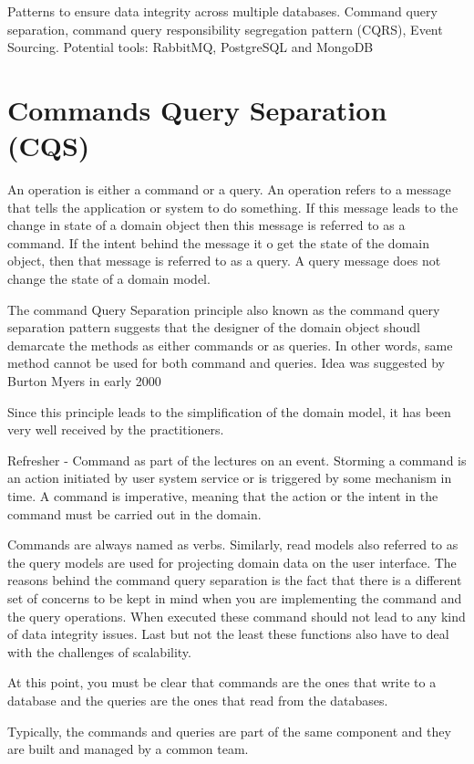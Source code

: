 Patterns to ensure data integrity across multiple databases.
Command query separation, command query responsibility segregation pattern (CQRS), Event Sourcing.
Potential tools: RabbitMQ, PostgreSQL and MongoDB

\section{Commands Query Separation (CQS)}
An operation is either a command or a query.
An operation refers to a message that tells the application or system to do something.
If this message leads to the change in state of a domain object then this message is referred to as a command.
If the intent behind the message it o get the state of the domain object, then that message is referred to as a query.
A query message does not change the state of a domain model.

The command Query Separation principle also known as the command query separation pattern suggests that the designer of the domain object shoudl demarcate the methods as either commands or as queries.
In other words, same method cannot be used for both command and queries.
Idea was suggested by Burton Myers in early 2000

Since this principle leads to the simplification of the domain model, it has been very well received by the practitioners.

Refresher - Command as part of the lectures on an event.
Storming a command is an action initiated by user system service or is triggered by some mechanism in time.
A command is imperative, meaning that the action or the intent in the command must be carried out in the domain.

Commands are always named as verbs.
Similarly, read models also referred to as the query models are used for projecting domain data on the user interface.
The reasons behind the command query separation is the fact that there is a different set of concerns to be kept in mind when you are implementing the command and the query operations.
When executed these command should not lead to any kind of data integrity issues.
Last but not the least these functions also have to deal with the challenges of scalability.

At this point, you must be clear that commands are the ones that write to a database and the queries are the ones that read from the databases.

Typically, the commands and queries are part of the same component and they are built and managed by a common team.

